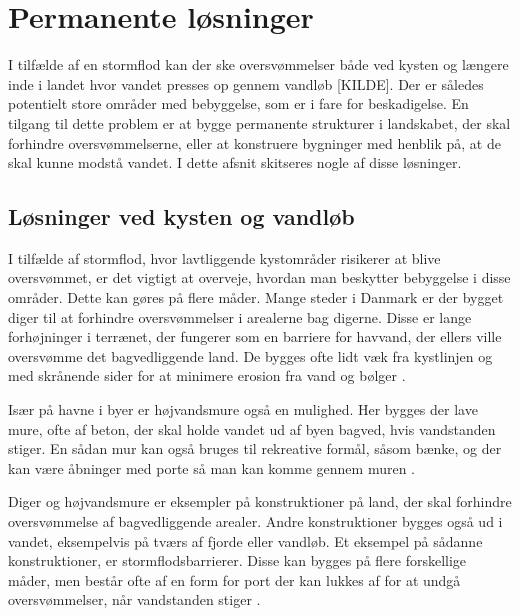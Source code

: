 
\section{Permanente løsninger}\label{sc:permanente}
I tilfælde af en stormflod kan der ske oversvømmelser både ved kysten og længere inde i landet hvor vandet presses op gennem vandløb \todo{}[KILDE]. Der er således potentielt store områder med bebyggelse, som er i fare for beskadigelse. En tilgang til dette problem er at bygge permanente strukturer i landskabet, der skal forhindre oversvømmelserne, eller at konstruere bygninger med henblik på, at de skal kunne modstå vandet. I dette afsnit skitseres nogle af disse løsninger. 

\subsection{Løsninger ved kysten og vandløb}
I tilfælde af stormflod, hvor lavtliggende kystområder risikerer at blive oversvømmet, er det vigtigt at overveje, hvordan man beskytter bebyggelse i disse områder. Dette kan gøres på flere måder. 
Mange steder i Danmark er der bygget diger til at forhindre oversvømmelser i arealerne bag digerne. Disse er lange forhøjninger i terrænet, der fungerer som en barriere for havvand, der ellers ville oversvømme det bagvedliggende land. De bygges ofte lidt væk fra kystlinjen og med skrånende sider for at minimere erosion fra vand og bølger \cite{havdiger}. 
\par
Især på havne i byer er højvandsmure også en mulighed. Her bygges der lave mure, ofte af beton, der skal holde vandet ud af byen bagved, hvis vandstanden stiger. En sådan mur kan også bruges til rekreative formål, såsom bænke, og der kan være åbninger med porte så man kan komme gennem muren \cite{hoejvandsmur}. 
\par
Diger og højvandsmure er eksempler på konstruktioner på land, der skal forhindre oversvømmelse af bagvedliggende arealer. Andre konstruktioner bygges også ud i vandet, eksempelvis på tværs af fjorde eller vandløb. Et eksempel på sådanne konstruktioner, er stormflodsbarrierer. Disse kan bygges på flere forskellige måder, men består ofte af en form for port der kan lukkes af for at undgå oversvømmelser, når vandstanden stiger \cite{stormflodbarriere}. 
